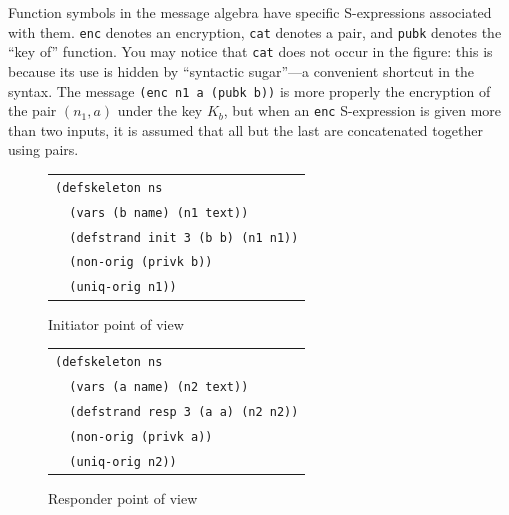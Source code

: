    Function symbols in the
{\cpsa} message algebra have specific S-expressions associated with
them.  \texttt{enc} denotes an encryption, \texttt{cat} denotes a
pair, and \texttt{pubk} denotes the ``key of'' function.  You may
notice that \texttt{cat} does not occur in the figure: this is because
its use is hidden by ``syntactic sugar''---a convenient shortcut in
the syntax.  The message \texttt{(enc n1 a (pubk b))} is more properly
the encryption of the pair $(n_1, a)$ under the key $K_b$, but when an
\texttt{enc} S-expression is given more than two inputs, it is assumed
that all but the last are concatenated together using pairs.

\begin{figure}
\centering
\begin{tabular}{l}
\verb|(defskeleton ns|\\
\verb|  (vars (b name) (n1 text))|\\
\verb|  (defstrand init 3 (b b) (n1 n1))|\\
\verb|  (non-orig (privk b))|\\
\verb|  (uniq-orig n1))|
\end{tabular}
\caption{Initiator point of view}
\label{fig:ns init pov}
\end{figure}

\begin{figure}
\centering
\begin{tabular}{l}
\verb|(defskeleton ns|\\
\verb|  (vars (a name) (n2 text))|\\
\verb|  (defstrand resp 3 (a a) (n2 n2))|\\
\verb|  (non-orig (privk a))|\\
\verb|  (uniq-orig n2))|
\end{tabular}
\caption{Responder point of view}
\label{fig:ns resp pov}
\end{figure}

